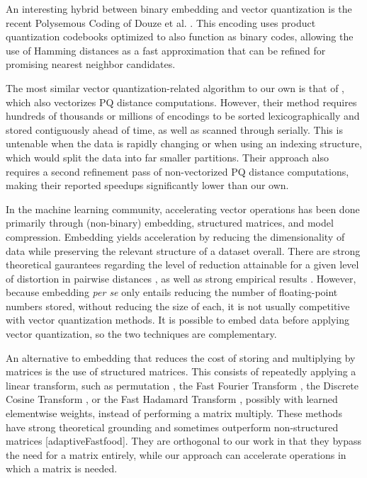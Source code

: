 An interesting hybrid between binary embedding and vector quantization is the recent Polysemous Coding of Douze et al. \cite{polysemous}. This encoding uses product quantization codebooks optimized to also function as binary codes, allowing the use of Hamming distances as a fast approximation that can be refined for promising nearest neighbor candidates. %

The most similar vector quantization-related algorithm to our own is that of \cite{simdpq}, which also vectorizes PQ distance computations. However, their method requires hundreds of thousands or millions of encodings to be sorted lexicographically and stored contiguously ahead of time, as well as scanned through serially. This is untenable when the data is rapidly changing or when using an indexing structure, which would split the data into far smaller partitions. Their approach also requires a second refinement pass of non-vectorized PQ distance computations, making their reported speedups significantly lower than our own.

In the machine learning community, accelerating vector operations has been done primarily through (non-binary) embedding, structured matrices, and model compression. Embedding yields acceleration by reducing the dimensionality of data while preserving the relevant structure of a dataset overall. There are strong theoretical gaurantees regarding the level of reduction attainable for a given level of distortion in pairwise distances \cite{jl, fastJL, jlIsTight}, as well as strong empirical results \cite{superBitLSH, compressiveMining}. However, because embedding \textit{per se} only entails reducing the number of floating-point numbers stored, without reducing the size of each, it is not usually competitive with vector quantization methods. It is possible to embed data before applying vector quantization, so the two techniques are complementary.

An alternative to embedding that reduces the cost of storing and multiplying by matrices is the use of structured matrices. This consists of repeatedly applying a linear transform, such as permutation \cite{adaptiveFastfood}, the Fast Fourier Transform \cite{orthogonalRandomFeatures}, the Discrete Cosine Transform \cite{acdc}, or the Fast Hadamard Transform \cite{crossPolytope, structuredSpinners}, possibly with learned elementwise weights, instead of performing a matrix multiply. These methods have strong theoretical grounding \cite{structuredSpinners} and sometimes outperform non-structured matrices [adaptiveFastfood]. They are orthogonal to our work in that they bypass the need for a matrix entirely, while our approach can accelerate operations in which a matrix is needed.

